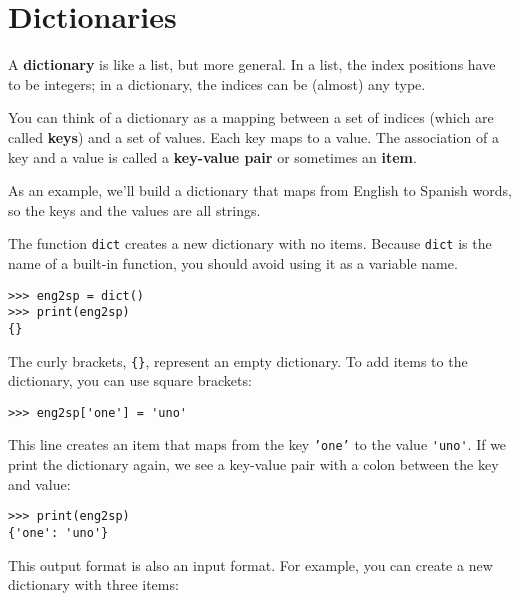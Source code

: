 
\chapter{Dictionaries}


A {\bf dictionary} is like a list, but more general.  In a list,
the index positions have to be integers; in a dictionary, 
the indices can be (almost) any type.

You can think of a dictionary as a mapping between a set of indices
(which are called {\bf keys}) and a set of values.  Each key maps to a
value.  The association of a key and a value is called a {\bf
  key-value pair} or sometimes an {\bf item}.

As an example, we'll build a dictionary that maps from English
to Spanish words, so the keys and the values are all strings.

The function {\tt dict} creates a new dictionary with no items.
Because {\tt dict} is the name of a built-in function, you
should avoid using it as a variable name.


\beforeverb
\begin{verbatim}
>>> eng2sp = dict()
>>> print(eng2sp)
{}
\end{verbatim}
\afterverb

The curly brackets, \verb"{}", represent an empty dictionary.
To add items to the dictionary, you can use square brackets:


\beforeverb
\begin{verbatim}
>>> eng2sp['one'] = 'uno'
\end{verbatim}
\afterverb
%
This line creates an item that maps from the key
{\tt 'one'} to the value \verb"'uno'".  If we print the
dictionary again, we see a key-value pair with a colon
between the key and value:

\beforeverb
\begin{verbatim}
>>> print(eng2sp)
{'one': 'uno'}
\end{verbatim}
\afterverb
%
This output format is also an input format.  For example,
you can create a new dictionary with three items:

